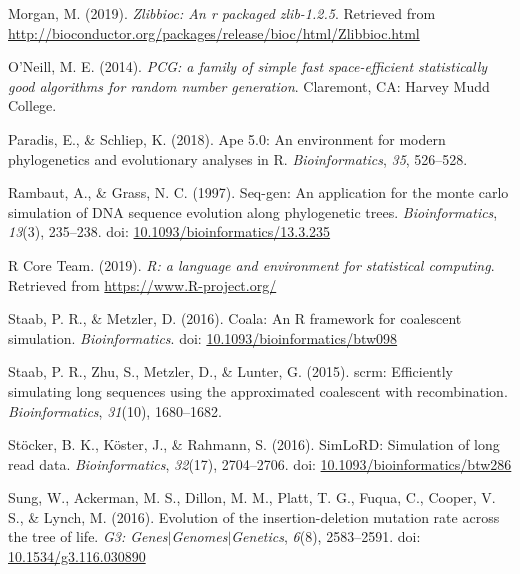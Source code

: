 \documentclass[12pt,]{article}
\begin{document}
\leavevmode\hypertarget{ref-Morgan_2019}{}%
Morgan, M. (2019). \emph{Zlibbioc: An r packaged zlib-1.2.5}. Retrieved from \url{http://bioconductor.org/packages/release/bioc/html/Zlibbioc.html}

\leavevmode\hypertarget{ref-Oneill_2014pcg}{}%
O'Neill, M. E. (2014). \emph{PCG: a family of simple fast space-efficient statistically good algorithms for random number generation}. Claremont, CA: Harvey Mudd College.

\leavevmode\hypertarget{ref-Paradis_2018}{}%
Paradis, E., \& Schliep, K. (2018). Ape 5.0: An environment for modern phylogenetics and evolutionary analyses in R. \emph{Bioinformatics}, \emph{35}, 526--528.

\leavevmode\hypertarget{ref-Rambaut_1997}{}%
Rambaut, A., \& Grass, N. C. (1997). Seq-gen: An application for the monte carlo simulation of DNA sequence evolution along phylogenetic trees. \emph{Bioinformatics}, \emph{13}(3), 235--238. doi: \href{https://doi.org/10.1093/bioinformatics/13.3.235}{10.1093/bioinformatics/13.3.235}

\leavevmode\hypertarget{ref-R_Core_Team_2019}{}%
R Core Team. (2019). \emph{R: a language and environment for statistical computing}. Retrieved from \url{https://www.R-project.org/}

\leavevmode\hypertarget{ref-Paul_R._Staab_2016}{}%
Staab, P. R., \& Metzler, D. (2016). Coala: An R framework for coalescent simulation. \emph{Bioinformatics}. doi: \href{https://doi.org/10.1093/bioinformatics/btw098}{10.1093/bioinformatics/btw098}

\leavevmode\hypertarget{ref-Paul_R._Staab_2015}{}%
Staab, P. R., Zhu, S., Metzler, D., \& Lunter, G. (2015). scrm: Efficiently simulating long sequences using the approximated coalescent with recombination. \emph{Bioinformatics}, \emph{31}(10), 1680--1682.

\leavevmode\hypertarget{ref-St_cker_2016}{}%
Stöcker, B. K., Köster, J., \& Rahmann, S. (2016). SimLoRD: Simulation of long read data. \emph{Bioinformatics}, \emph{32}(17), 2704--2706. doi: \href{https://doi.org/10.1093/bioinformatics/btw286}{10.1093/bioinformatics/btw286}

\leavevmode\hypertarget{ref-Sung_2016}{}%
Sung, W., Ackerman, M. S., Dillon, M. M., Platt, T. G., Fuqua, C., Cooper, V. S., \& Lynch, M. (2016). Evolution of the insertion-deletion mutation rate across the tree of life. \emph{G3: Genes\(\vert\)Genomes\(\vert\)Genetics}, \emph{6}(8), 2583--2591. doi: \href{https://doi.org/10.1534/g3.116.030890}{10.1534/g3.116.030890}
\end{document}
